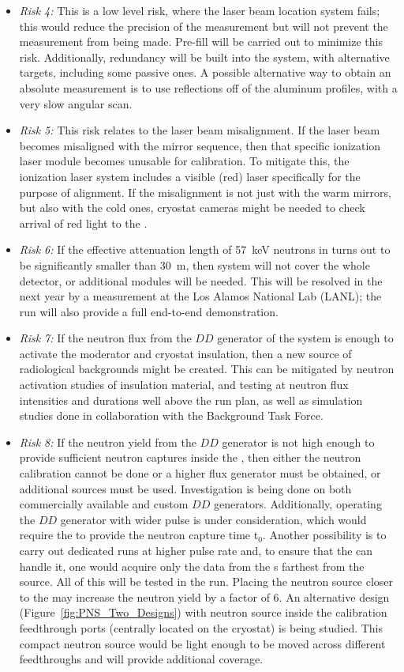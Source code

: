 \begin{itemize}
    \item \textit{Risk 4:} This is a low level risk, where the laser beam location system fails; this would reduce the precision of the \efield measurement but will not prevent the measurement from being made. Pre-fill  will be carried out to minimize this risk. Additionally, redundancy will be built into the system, with alternative targets, including some passive ones. A possible alternative way to obtain an absolute measurement is to use reflections off of the aluminum  profiles, with a very slow angular scan.
    \item \textit{Risk 5:} This risk relates to the laser beam misalignment. If the laser beam becomes misaligned with the mirror sequence, then that specific ionization laser module becomes unusable for calibration. To mitigate this, the ionization laser system includes a visible (red) laser specifically for the purpose of alignment. If the misalignment is not just with the warm mirrors, but also with the cold ones, cryostat cameras might be needed to check arrival of red light to the .
    \item \textit{Risk 6:} If the effective attenuation length of \SI{57}{keV} neutrons in  turns out to be significantly smaller than \SI{30}{m}, then  system will not cover the whole detector, or additional modules will be needed. This will be resolved in the next year by a measurement at the Los Alamos National Lab (LANL); the  run will also provide a full end-to-end demonstration.
    \item \textit{Risk 7:} If the neutron flux from the $DD$ generator of the  system is enough to activate the moderator and cryostat insulation, then a new source of radiological backgrounds might be created. This can be mitigated by neutron activation studies of insulation material, and  testing at neutron flux intensities and durations well above the run plan, as well as simulation studies done in collaboration with the  Background Task Force.
    \item \textit{Risk 8:} If the neutron yield from the $DD$ generator is not high enough to provide sufficient neutron captures inside the , then either the neutron calibration cannot be done or a higher flux generator must be obtained, or additional sources must be used. Investigation is being done on both commercially available and  custom $DD$ generators. Additionally, operating the $DD$ generator with wider  pulse is under consideration, which would require the  to provide the neutron capture time t$_{0}$. Another possibility is to carry out dedicated runs at higher pulse rate and, to ensure that the  can handle it, one would acquire only the data from the s farthest from the source. All of this will be tested in the  run. Placing the neutron source closer to the  may increase the neutron yield by a factor of 6. An alternative design (Figure~\ref{fig:PNS_Two_Designs}) with neutron source inside the calibration feedthrough ports (centrally located on the cryostat) is being studied. This compact neutron source would be light enough to be moved across different feedthroughs and will provide additional coverage.

\end{itemize}
